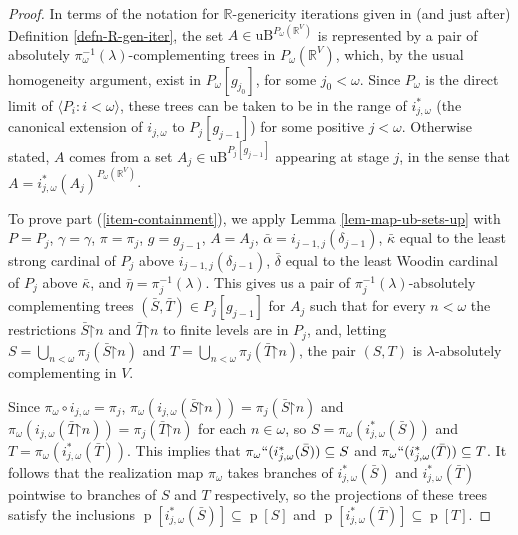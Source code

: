\documentclass[fleqn, 11pt]{amsart}
\theoremstyle{plain}
\theoremstyle{definition}
\theoremstyle{remark}
\newcommand{\uB}{\mathrm{uB}}
\newcommand{\bbR}{\mathbb{R}}
\newcommand{\restrict}{\mathord{\restriction}}
\DeclareMathOperator{\p}{p}
\begin{document}
\begin{proof}
In terms of the notation for $\mathbb{R}$-genericity iterations given in (and just after) Definition \ref{defn-R-gen-iter}, the set $A \in \uB^{P_\omega(\mathbb{R}^V)}$ is represented by a pair of absolutely $\pi^{-1}_{\omega}(\lambda)$-complementing trees in $P_{\omega}(\bbR^{V})$, which, by the usual homogeneity argument, exist in $P_{\omega}[g_{j_{0}}]$, for some $j_{0} < \omega$.  Since $P_{\omega}$ is the direct limit of $\langle P_{i} : i < \omega \rangle$, these trees can be taken to be in the range of $i^{*}_{j,\omega}$ (the canonical extension of $i_{j,\omega}$ to $P_{j}[g_{j-1}]$) for some positive $j < \omega$.  
Otherwise stated, $A$ comes from a set $A_j \in \uB^{P_j[g_{j-1}]}$ appearing at stage $j$, in the sense that $A = i_{j,\omega}^*(A_j)^{P_\omega(\mathbb{R}^V)}$. 
 

To prove part (\ref{item-containment}), we apply Lemma \ref{lem-map-ub-sets-up} with $P = P_j$, 
$\gamma = \gamma$, $\pi = \pi_j$, $g = g_{j-1}$, $A = A_j$, $\bar{\alpha} = i_{j-1,j}(\delta_{j-1})$, $\bar{\kappa}$ equal to the least strong cardinal of $P_j$ above $i_{j-1,j}(\delta_{j-1})$, $\bar{\delta}$ equal to the least Woodin cardinal of $P_j$ above $\bar{\kappa}$, and $\bar{\eta} = \pi_j^{-1}(\lambda)$. This gives us a pair of $\pi^{-1}_j(\lambda)$-absolutely complementing trees $(\bar{S},\bar{T}) \in P_j[g_{j-1}]$ for $A_j$ such that for every $n < \omega$ the restrictions $\bar{S}\restrict n$ and $\bar{T} \restrict n$ to finite levels are in $P_j$, and, letting $S = \bigcup_{n<\omega} \pi_j(\bar{S}\restrict n)$ and $T = \bigcup_{n<\omega} \pi_j(\bar{T}\restrict n)$, the pair $(S,T)$ is $\lambda$-absolutely complementing in $V$.
 
Since $\pi_{\omega} \circ i_{j,\omega} = \pi_{j}$, $\pi_{\omega}(i_{j,\omega}(\bar{S} \restrict n)) = \pi_{j}(\bar{S} \restrict n)$ and $\pi_{\omega}(i_{j,\omega}(\bar{T} \restrict n)) = \pi_{j}(\bar{T} \restrict n)$ for each $n \in \omega$, so $S = \pi_{\omega}(i^{*}_{j,\omega}(\bar{S}))$ and $T = \pi_{\omega}(i^{*}_{j,\omega}(\bar{T}))$. 
This implies that $\pi_\omega `` (i_{j,\omega}^*(\bar{S})) \subseteq S$ and $\pi_\omega `` (i_{j,\omega}^*(\bar{T})) \subseteq T$.
It follows that the realization map $\pi_\omega$ takes branches of $i_{j,\omega}^*(\bar{S})$ and $i_{j,\omega}^*(\bar{T})$ pointwise to branches of $S$ and $T$ respectively, so the projections of these trees satisfy the inclusions $\p[i_{j,\omega}^*(\bar{S})] \subseteq \p[S]$ and $\p[i_{j,\omega}^*(\bar{T})] \subseteq \p[T]$.


\end{proof}
\end{document}
